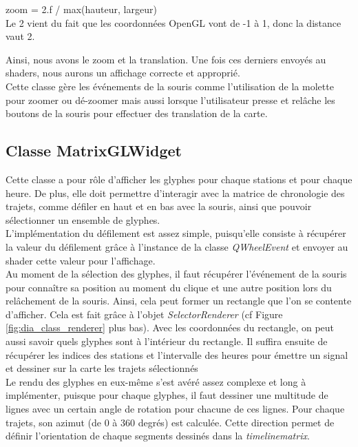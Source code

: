 \documentclass[12pt]{article}
\begin{document}
	zoom = 2.f / max(hauteur, largeur)\\

	Le 2 vient du fait que les coordonnées OpenGL vont de -1 à 1, donc la distance vaut 2.

	Ainsi, nous avons le zoom et la translation. Une fois ces derniers envoyés au shaders, nous aurons un affichage correcte et approprié.\\

	Cette classe gère les événements de la souris comme l’utilisation de la molette pour zoomer ou dé-zoomer mais aussi lorsque l’utilisateur presse et relâche les boutons de la souris pour effectuer des translation de la carte.
		
		\subsection{Classe MatrixGLWidget}		
		Cette classe a pour rôle d’afficher les glyphes pour chaque stations et pour chaque heure. De plus, elle doit permettre d’interagir avec la matrice de chronologie des trajets, comme défiler en
		haut et en bas avec la souris, ainsi que pouvoir sélectionner un ensemble de glyphes.\\

		L'implémentation du défilement est assez simple, puisqu'elle consiste à récupérer la valeur
		du défilement grâce à l'instance de la classe \textit{QWheelEvent} et envoyer au shader cette valeur pour l’affichage.\\

		Au moment de la sélection des glyphes, il faut récupérer l'événement de la souris pour connaître sa position au moment du clique et une autre position lors du relâchement de la souris. Ainsi, cela peut former un rectangle que l’on se contente d’afficher. Cela est fait grâce à l’objet \textit{SelectorRenderer} (cf Figure \ref{fig:dia_class_renderer} plus bas). Avec les coordonnées du rectangle, on peut aussi savoir quels glyphes sont à l'intérieur du rectangle. Il suffira ensuite de récupérer les indices des stations et l’intervalle des heures pour émettre un signal et dessiner sur la carte les trajets sélectionnés\\

		Le rendu des glyphes en eux-même s’est avéré assez complexe et long à implémenter, puisque pour chaque glyphes, il faut dessiner une multitude de lignes avec un certain angle de rotation pour chacune de ces lignes. Pour chaque trajets, son azimut (de 0 à 360 degrés) est calculée. Cette direction permet de définir l'orientation de chaque segments dessinés dans la \textit{timelinematrix}.
		
\end{document}
